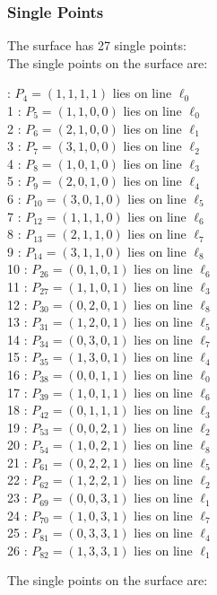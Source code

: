 \documentclass{article}
\begin{document}
{\subsubsection*{Single Points}
The surface has 27 single points:\\
The single points on the surface are:\\
\begin{multicols}{2}
 : $P_{4}=( 1, 1, 1, 1 )$ lies on line $\ell_{0}$\\
1 : $P_{5}=( 1, 1, 0, 0 )$ lies on line $\ell_{0}$\\
2 : $P_{6}=( 2, 1, 0, 0 )$ lies on line $\ell_{1}$\\
3 : $P_{7}=( 3, 1, 0, 0 )$ lies on line $\ell_{2}$\\
4 : $P_{8}=( 1, 0, 1, 0 )$ lies on line $\ell_{3}$\\
5 : $P_{9}=( 2, 0, 1, 0 )$ lies on line $\ell_{4}$\\
6 : $P_{10}=( 3, 0, 1, 0 )$ lies on line $\ell_{5}$\\
7 : $P_{12}=( 1, 1, 1, 0 )$ lies on line $\ell_{6}$\\
8 : $P_{13}=( 2, 1, 1, 0 )$ lies on line $\ell_{7}$\\
9 : $P_{14}=( 3, 1, 1, 0 )$ lies on line $\ell_{8}$\\
10 : $P_{26}=( 0, 1, 0, 1 )$ lies on line $\ell_{6}$\\
11 : $P_{27}=( 1, 1, 0, 1 )$ lies on line $\ell_{3}$\\
12 : $P_{30}=( 0, 2, 0, 1 )$ lies on line $\ell_{8}$\\
13 : $P_{31}=( 1, 2, 0, 1 )$ lies on line $\ell_{5}$\\
14 : $P_{34}=( 0, 3, 0, 1 )$ lies on line $\ell_{7}$\\
15 : $P_{35}=( 1, 3, 0, 1 )$ lies on line $\ell_{4}$\\
16 : $P_{38}=( 0, 0, 1, 1 )$ lies on line $\ell_{0}$\\
17 : $P_{39}=( 1, 0, 1, 1 )$ lies on line $\ell_{6}$\\
18 : $P_{42}=( 0, 1, 1, 1 )$ lies on line $\ell_{3}$\\
19 : $P_{53}=( 0, 0, 2, 1 )$ lies on line $\ell_{2}$\\
20 : $P_{54}=( 1, 0, 2, 1 )$ lies on line $\ell_{8}$\\
21 : $P_{61}=( 0, 2, 2, 1 )$ lies on line $\ell_{5}$\\
22 : $P_{62}=( 1, 2, 2, 1 )$ lies on line $\ell_{2}$\\
23 : $P_{69}=( 0, 0, 3, 1 )$ lies on line $\ell_{1}$\\
24 : $P_{70}=( 1, 0, 3, 1 )$ lies on line $\ell_{7}$\\
25 : $P_{81}=( 0, 3, 3, 1 )$ lies on line $\ell_{4}$\\
26 : $P_{82}=( 1, 3, 3, 1 )$ lies on line $\ell_{1}$\\
\end{multicols}
The single points on the surface are:\\
}
\end{document}
